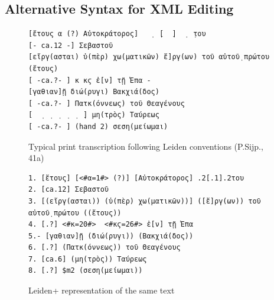 \documentclass[]{article}
\begin{document}
\subsection*{Alternative Syntax for XML Editing}\nocite{xsugar}

\begin{figure}[ht]
    \begin{verbatim}
[ἔτους α (?) Αὐτοκράτορος]   ̣  ̣[  ̣]  ̣  ̣του 
[- ca.12 -] Σεβαστοῦ 
[εἴργ(ασται) ὑ(πὲρ) χω(ματικῶν) ἔ]ργ(ων) τοῦ αὐτοῦ̣ πρώτου (ἔτους) 
[ -ca.?- ] κ κϛ ἐ[ν] τῇ Ἐπα -
[γαθιαν]ῇ διώ(ρυγι) Βακχιά(δος) 
[ -ca.?- ] Πατκ(όννεως) τοῦ Θεαγένους 
[  ̣  ̣  ̣  ̣  ̣  ̣] μη(τρὸς) Ταύρεως 
[ -ca.?- ] (hand 2) σεση(μείωμαι)
    \end{verbatim}
    \caption{Typical print transcription following Leiden conventions (P.Sijp., 41a)\label{leiden}}
\end{figure}\nocite{psijp}

\begin{figure}[h]
    \begin{verbatim}
1. [ἔτους] [<#α=1#> (?)] [Αὐτοκράτορος] .2[.1].2του
2. [ca.12] Σεβαστοῦ
3. [(εἴργ(ασται)) (ὑ(πὲρ) χω(ματικῶν))] ([ἔ]ργ(ων)) τοῦ αὐτοῦ̣ πρώτου ((ἔτους))
4. [.?] <#κ=20#>  <#κϛ=26#> ἐ[ν] τῇ Ἐπα
5.- [γαθιαν]ῇ (διώ(ρυγι)) (Βακχιά(δος))
6. [.?] (Πατκ(όννεως)) τοῦ Θεαγένους
7. [ca.6] (μη(τρὸς)) Ταύρεως
8. [.?] $m2 (σεση(μείωμαι))
    \end{verbatim}
    \caption{Leiden+ representation of the same text\label{leidenp}}
\end{figure}
\end{document}
